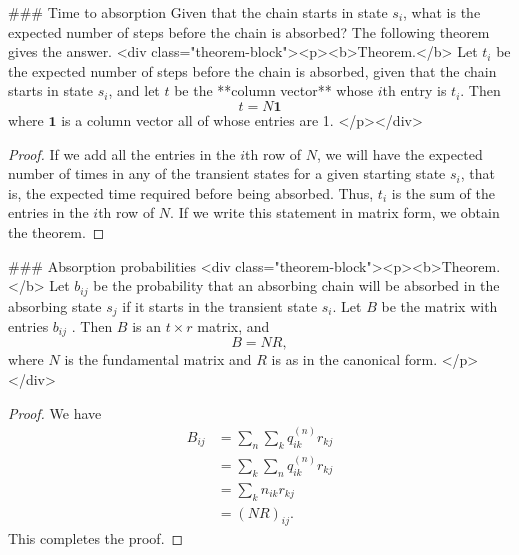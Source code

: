 ### Time to absorption
Given that the chain starts in state $s_i$, what is the expected number of steps before the chain is absorbed? The following theorem gives the answer.
<div class="theorem-block"><p><b>Theorem.</b> 
Let $t_i$ be the expected number of steps before the chain is absorbed, given that the chain starts in state $s_i$, and let $t$ be the **column vector** whose $i$th entry is $t_i$. Then
$$\begin{equation}
    t = N \mathbf{1}
\end{equation}$$
where $\mathbf{1}$ is a column vector all of whose entries are 1.
</p></div>

\begin{proof}
If we add all the entries in the $i$th row of $N$, we will have the expected number of times in any of the transient states for a given starting state $s_i$, that is, the expected time required before being absorbed. Thus, $t_i$ is the sum of the entries in the $i$th row of $N$. If we write this statement in matrix form, we obtain the theorem.
\end{proof}

### Absorption probabilities
<div class="theorem-block"><p><b>Theorem.</b> 
Let $b_{ij}$ be the probability that an absorbing chain will be absorbed in the absorbing state $s_j$ if it starts in the transient state $s_i$. Let $B$ be the matrix with entries $b_{ij}$ . Then $B$ is an $t\times r$ matrix, and
$$\begin{equation}
    B = NR,
\end{equation}$$
where $N$ is the fundamental matrix and $R$ is as in the canonical form.
</p></div>

\begin{proof}
We have 
$$\begin{equation}
    \begin{aligned} 
        B_{i j} &=\sum_{n} \sum_{k} q_{i k}^{(n)} r_{k j} \\ &=\sum_{k} \sum_{n} q_{i k}^{(n)} r_{k j} \\ &=\sum_{k} n_{i k} r_{k j} \\ &=(N R)_{i j}.
    \end{aligned}
\end{equation}$$
This completes the proof.
\end{proof}

